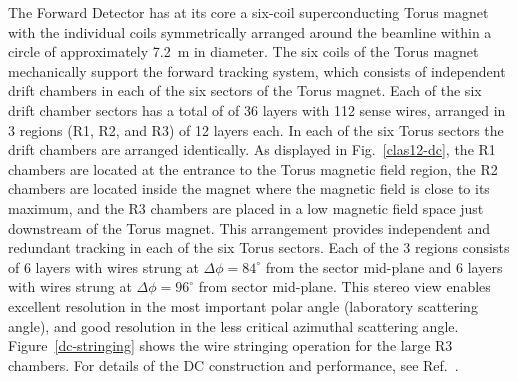 \documentclass[final,3p,twocolumn]{elsarticle}
\begin{document}
The Forward Detector has at its core a six-coil superconducting Torus magnet with the individual coils
symmetrically arranged around the beamline within a circle of approximately 7.2~m in diameter. The six coils of the
Torus magnet mechanically support the forward tracking system, which consists of independent drift chambers in
each of the six sectors of the Torus magnet. Each of the six drift chamber sectors has a total of of 36 layers with
112 sense wires, arranged in 3 regions (R1, R2, and R3) of 12 layers each. In each of the six Torus sectors the drift
chambers are arranged identically. As displayed in Fig.~\ref{clas12-dc}, the R1 chambers are located at the entrance
to the Torus magnetic field region, the R2 chambers are located inside the magnet where the magnetic field is close
to its maximum, and the R3 chambers are placed in a low magnetic field space just downstream of the Torus magnet.
This arrangement provides independent and redundant tracking in each of the six Torus sectors. Each of the 3 regions
consists of 6 layers with wires strung at $\Delta{\phi} = 84^\circ$ from the sector mid-plane and 6 layers with wires
strung at $\Delta{\phi} = 96^\circ$ from sector mid-plane. This stereo view enables excellent resolution in the most
important polar angle (laboratory scattering angle), and good resolution in the less critical azimuthal scattering angle.
Figure~\ref{dc-stringing} shows the wire stringing operation for the large R3 chambers. For details of the DC
construction and performance, see Ref.~\cite{DC}.
\end{document}
